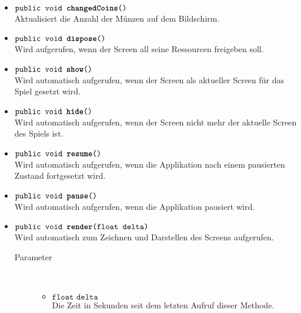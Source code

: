\begin{description}
\begin{itemize}
		\item $\texttt{public void \textbf{changedCoins}()}$ \\ Aktualisiert die Anzahl der Münzen auf dem Bildschirm. 
				
		\item $\texttt{public void \textbf{dispose}()}$ \\ Wird aufgerufen, wenn der Screen all seine Ressourcen freigeben soll.
		
		\item $\texttt{public void \textbf{show}()}$ \\ Wird automatisch aufgerufen, wenn der Screen als aktueller Screen für das Spiel gesetzt wird.
	
		\item $\texttt{public void \textbf{hide}()}$ \\ Wird automatisch aufgerufen, wenn der Screen nicht mehr der aktuelle Screen des Spiels ist.
	
		\item $\texttt{public void \textbf{resume}()}$ \\ Wird automatisch aufgerufen, wenn die Applikation nach einem pausierten Zustand fortgesetzt wird.	
	
		\item $\texttt{public void \textbf{pause}()}$ \\ Wird automatisch aufgerufen, wenn die Applikation pausiert wird.
	
		\item $\texttt{public void \textbf{render}(float delta)}$ \\ Wird automatisch zum Zeichnen und Darstellen des Screens aufgerufen.
		\begin{description}
			\item[Parameter] \hfill \\
			\vspace{-.8cm}
			\begin{itemize}
				\item $\texttt{float delta}$ \\ Die Zeit in Sekunden seit dem letzten Aufruf dieser Methode.
			\end{itemize}
		\end{description}	
	

\end{itemize}
\end{description}
